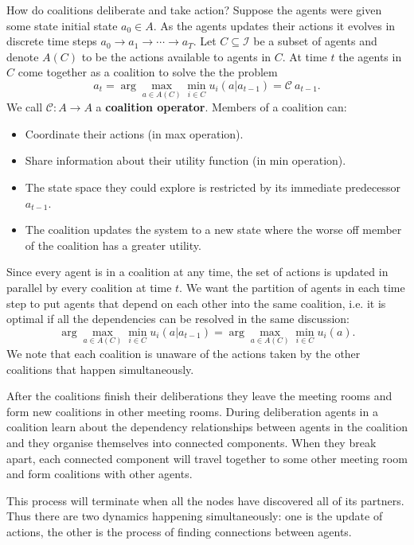 How do coalitions deliberate and take action? Suppose the agents were given some state initial state $a_0 \in A$. As the agents updates their actions it evolves in discrete time steps $a_0 \to a_1 \to \cdots \to a_T$.  Let $C \subseteq \mathcal{I}$ be a subset of agents and denote $A(C)$ to be the actions available to agents in $C$. At time $t$ the agents in $C$ come together as a coalition to solve the the problem
\begin{equation}
a_t = \arg\max_{a \in A(C)} \min_{i \in C} u_i(a \lvert a_{t-1})= \mathcal{C}\ a_{t-1}.
\end{equation}
We call $\mathcal{C}: A \to A$ a \textbf{coalition operator}. Members of a coalition can:
\begin{itemize}
 \item Coordinate their actions (in max operation).
 \item Share information about their utility function (in min operation).
 \item The state space they could explore is restricted by its immediate predecessor $a_{t-1}$.
 \item The coalition updates the system to a new state where the worse off member of the coalition has a greater utility.
\end{itemize}
Since every agent is in a coalition at any time, the set of actions is updated in parallel by every coalition at time $t$. We want the partition of agents in each time step to put agents that depend on each other into the same coalition, i.e. it is optimal if all the dependencies can be resolved in the same discussion:
\begin{equation}
\arg\max_{a \in A(C)} \min_{i \in C} u_i(a \lvert a_{t-1})= \arg\max_{a \in A(C)} \min_{i \in C} u_i(a).
\end{equation}
We note that each coalition is unaware of the actions taken by the other coalitions that happen simultaneously.

After the coalitions finish their deliberations they leave the meeting rooms and form new coalitions in other meeting rooms. During deliberation agents in a coalition learn about the dependency relationships between agents in the coalition and they organise themselves into connected components. When they break apart, each connected component will travel together to some other meeting room and form coalitions with other agents.

This process will terminate when all the nodes have discovered all of its partners. Thus there are two dynamics happening simultaneously: one is the update of actions, the other is the process of finding connections between agents.

